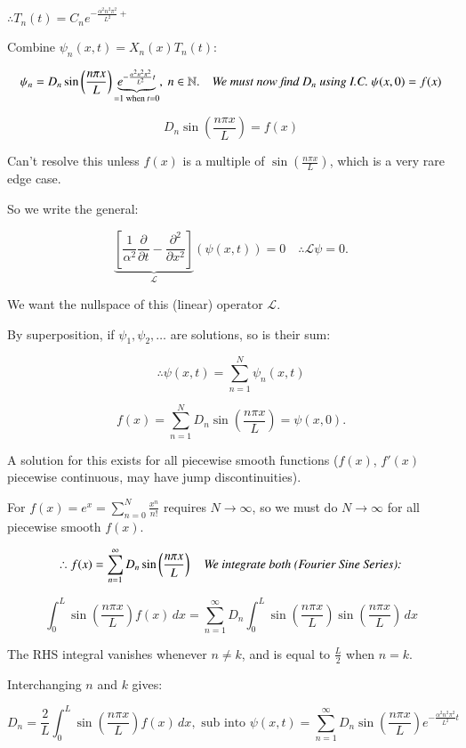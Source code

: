 \documentclass{report}
\begin{document}
$\therefore T_n(t)=C_ne^{-\frac{\alpha^2n^2\pi^2}{L^2}+}$


Combine $\psi_n(x, t) = X_n(x) T_n(t)$:

$$
\psi_n = D_n \sin\left(\frac{n \pi x}{L}\right) \underbrace{e^{-\frac{\alpha^2 n^2 \pi^2}{L^2} t}}_{=1\text{ when }t=0}, \ n \in \mathbb{N}.\quad \text{\textit{We must now find $D_n$ using I.C. $\psi(x, 0) = f(x)$}}
$$

$$
D_n\sin\left(\dfrac{n\pi x}{L}\right)=f(x)
$$

Can't resolve this unless $f(x)$ is a multiple of $\sin\left(\frac{n \pi x}{L}\right)$, which is a very rare edge case.

So we write the general:

$$
\underbrace{\left[\frac{1}{\alpha^2} \frac{\partial}{\partial t} - \frac{\partial^2}{\partial x^2}\right]}_{\mathcal{L}} (\psi(x, t)) = 0\quad \therefore \mathcal{L}\psi = 0.
$$

We want the nullspace of this (linear) operator $\mathcal{L}$.

By superposition, if $\psi_1, \psi_2, \dots$ are solutions, so is their sum:

$$
\therefore \psi(x, t) = \sum\limits_{n=1}^N \psi_n(x, t)
$$

$$
f(x) = \sum\limits_{n=1}^N D_n \sin\left(\dfrac{n \pi x}{L}\right) = \psi(x, 0).
$$

A solution for this exists for all piecewise smooth functions ($f(x)$, $f'(x)$ piecewise continuous, may have jump discontinuities).

For $f(x) = e^{x} =\sum\limits_{n=0}^N \frac{x^n}{n!}$ requires $N \to \infty$, so we must do $N \to \infty$ for all piecewise smooth $f(x)$.

$$
\therefore f(x) = \sum\limits_{n=1}^\infty D_n \sin\left(\dfrac{n \pi x}{L}\right)\quad \text{\textit{We integrate both (Fourier Sine Series):}}
$$


$$
\displaystyle\int_0^L \sin\left(\frac{n \pi x}{L}\right) f(x) \, dx = \sum\limits_{n=1}^\infty D_n \displaystyle\int_0^L \sin\left(\dfrac{n \pi x}{L}\right) \sin\left(\dfrac{n \pi x}{L}\right) \, dx
$$

The RHS integral vanishes whenever $n \neq k$, and is equal to $\frac{L}{2}$ when $n = k$.

Interchanging $n$ and $k$ gives:

\[
\boxed{
D_n = \dfrac{2}{L} \int_0^L \sin\left(\dfrac{n \pi x}{L}\right) f(x) \, dx,\text{ sub into } 
\psi(x,t)=\sum\limits_{n=1}^{\infty} D_n \sin\left(\dfrac{n\pi x}{L}\right) 
e^{-\frac{\alpha^2n^2\pi^2}{L^2}t}
}
\]
\end{document}
